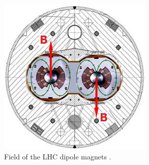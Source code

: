 		\begin{figure}[!ht]
		\centering
		\includegraphics[width=.45\textwidth,keepaspectratio=true]{chapters/chapter3_experiment/images/dipole-field.jpeg}
		\caption{Field of the \gls{LHC} dipole magnets \cite{dipole-field}.}
		\label{fig:dipole-field}
		\end{figure}


